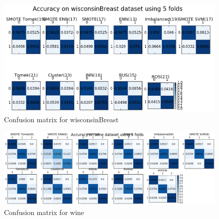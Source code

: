 \documentclass{article}
\begin{document}
			\begin{figure}\centering\includegraphics[width=\textwidth]{output/wisconsinBreast_balancing.png}\caption{Confusion matrix for wisconsinBreast}\end{figure}
			\begin{figure}\centering\includegraphics[width=\textwidth]{output/wine_balancing.png}\caption{Confusion matrix for wine}\end{figure}
			
		
\end{document}
